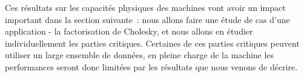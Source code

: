 \bigskip
\bigskip

Ces résultats sur les capacités physiques des machines vont avoir un impact important dans la section suivante~: nous allons faire une étude de cas d'une application - la factorisation de Cholesky, et nous allons en étudier individuellement les parties critiques.
Certaines de ces parties critiques peuvent utiliser un large ensemble de données, en pleine charge de la machine les performances seront donc limitées par les résultats que nous venons de décrire.

